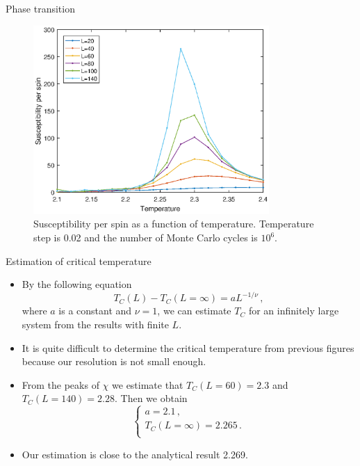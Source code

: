 \documentclass{beamer}
\begin{document}
\begin{frame}{Phase transition}
\begin{figure}
	\includegraphics[width=0.8\textwidth]{Tran_sus.eps}
	\caption{Susceptibility per spin as a function of temperature. Temperature step is 0.02 and the number of Monte Carlo cycles is $10^6$.  }
\end{figure}
\end{frame}

\begin{frame}{Estimation of critical temperature}
\begin{itemize}
\item<1-> By the following equation 
\begin{equation}
T_C(L)-T_C(L=\infty) = aL^{-1/\nu}\,,
\label{eq:tc}
\end{equation}
where $a$ is a constant and $\nu=1$, 
we can estimate $T_C$ for an infinitely large system from the results with finite $L$. 
\item<2->
It is quite difficult to determine the critical temperature from previous figures 
because our resolution is not small enough. 
\item<3->
From the peaks of $\chi$ we estimate that $T_C(L=60)=2.3$ and $T_C(L=140)=2.28$. 
Then we obtain 
\begin{equation}
\left\{
\begin{array}{c}
a=2.1\,,  \\
T_C(L=\infty)=2.265\,.  \\
\end{array}
\right.
\end{equation}
\item<4-> Our estimation is close to the analytical result 2.269.
\end{itemize}
\end{frame}
\end{document}

